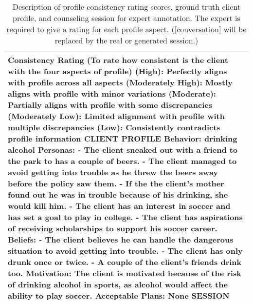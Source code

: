 \begin{table*}[tb]
\begin{tabularx}{\textwidth}{X}
\toprule
\textbf{Consistency Rating (To rate how consistent is the client with the four aspects of profile)}\newline
5 (High): Perfectly aligns with profile across all aspects \newline
4 (Moderately High): Mostly aligns with profile with minor variations \newline
3 (Moderate): Partially aligns with profile with some discrepancies \newline
2 (Moderately Low): Limited alignment with profile with multiple discrepancies \newline
1 (Low): Consistently contradicts profile information \newline
\textbf{CLIENT PROFILE} \newline
\textbf{Behavior:} drinking alcohol \newline
\textbf{Personas:}\newline
- The client sneaked out with a friend to the park to has a couple of beers.\newline
- The client managed to avoid getting into trouble as he threw the beers away before the policy saw them.\newline
- If the the client's mother found out he was in trouble because of his drinking, she would kill him.\newline
- The client has an interest in soccer and has set a goal to play in college.\newline
- The client has aspirations of receiving scholarships to support his soccer career.\newline
\textbf{Beliefs:} \newline
- The client believes he can handle the dangerous situation to avoid getting into trouble. \newline
- The client has only drunk once or twice. \newline
- A couple of the client's friends drink too. \newline
\textbf{Motivation:} The client is motivated because of the risk of drinking alcohol in sports, as alcohol would affect the ability to play soccer. \newline
\textbf{Acceptable Plans:} None \newline
\textbf{SESSION} \newline
[conversation]
\\ \bottomrule
\end{tabularx}
\caption{Description of profile consistency rating scores, ground truth client profile, and counseling session for expert annotation.  The expert is required to give a rating for each profile aspect. ([conversation] will be replaced by the real or generated session.)}
\label{tab:human_instruction1}
\end{table*}


